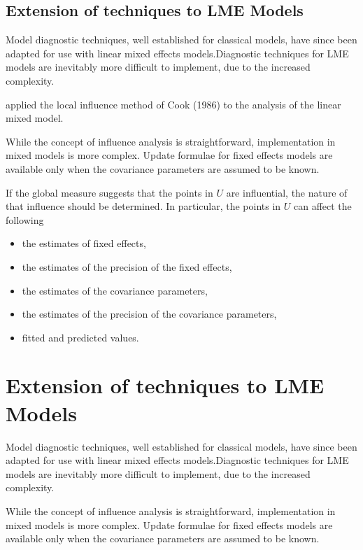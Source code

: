 \documentclass[12pt, a4paper]{article}
\begin{document}
\subsection{Extension of techniques to LME Models} %


Model diagnostic techniques, well established for classical models, have since been adapted for use with linear mixed effects models.Diagnostic techniques for LME models are inevitably more difficult to implement, due to the increased complexity.


\citet{Beckman} applied the local influence method of Cook (1986) to the analysis of the linear mixed model.


While the concept of influence analysis is straightforward, implementation in mixed models is more complex. Update formulae for fixed effects models are available only when the covariance parameters are assumed to be known.


If the global measure suggests that the points in $U$ are influential, the nature of that influence should be determined. In particular, the points in $U$ can affect the following


\begin{itemize}
	\item the estimates of fixed effects,
	\item the estimates of the precision of the fixed effects,
	\item the estimates of the covariance parameters,
	\item the estimates of the precision of the covariance parameters,
	\item fitted and predicted values.
\end{itemize}

\section{Extension of techniques to LME Models} %

Model diagnostic techniques, well established for classical models, have since been adapted for use with linear mixed effects models.Diagnostic techniques for LME models are inevitably more difficult to implement, due to the increased complexity.


While the concept of influence analysis is straightforward, implementation in mixed models is more complex. Update formulae for fixed effects models are available only when the covariance parameters are assumed to be known.
\end{document}
